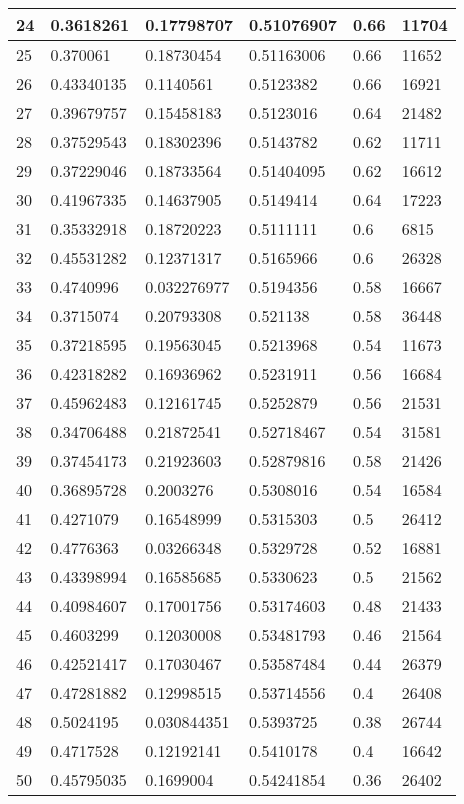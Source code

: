 \begin{longtable}{|l|l|l|l|l|l|}
24 & 0.3618261 & 0.17798707 & 0.51076907 & 0.66 & 11704 \\ \hline 
25 & 0.370061 & 0.18730454 & 0.51163006 & 0.66 & 11652 \\ \hline 
26 & 0.43340135 & 0.1140561 & 0.5123382 & 0.66 & 16921 \\ \hline 
27 & 0.39679757 & 0.15458183 & 0.5123016 & 0.64 & 21482 \\ \hline 
28 & 0.37529543 & 0.18302396 & 0.5143782 & 0.62 & 11711 \\ \hline 
29 & 0.37229046 & 0.18733564 & 0.51404095 & 0.62 & 16612 \\ \hline 
30 & 0.41967335 & 0.14637905 & 0.5149414 & 0.64 & 17223 \\ \hline 
31 & 0.35332918 & 0.18720223 & 0.5111111 & 0.6 & 6815 \\ \hline 
32 & 0.45531282 & 0.12371317 & 0.5165966 & 0.6 & 26328 \\ \hline 
33 & 0.4740996 & 0.032276977 & 0.5194356 & 0.58 & 16667 \\ \hline 
34 & 0.3715074 & 0.20793308 & 0.521138 & 0.58 & 36448 \\ \hline 
35 & 0.37218595 & 0.19563045 & 0.5213968 & 0.54 & 11673 \\ \hline 
36 & 0.42318282 & 0.16936962 & 0.5231911 & 0.56 & 16684 \\ \hline 
37 & 0.45962483 & 0.12161745 & 0.5252879 & 0.56 & 21531 \\ \hline 
38 & 0.34706488 & 0.21872541 & 0.52718467 & 0.54 & 31581 \\ \hline 
39 & 0.37454173 & 0.21923603 & 0.52879816 & 0.58 & 21426 \\ \hline 
40 & 0.36895728 & 0.2003276 & 0.5308016 & 0.54 & 16584 \\ \hline 
41 & 0.4271079 & 0.16548999 & 0.5315303 & 0.5 & 26412 \\ \hline 
42 & 0.4776363 & 0.03266348 & 0.5329728 & 0.52 & 16881 \\ \hline 
43 & 0.43398994 & 0.16585685 & 0.5330623 & 0.5 & 21562 \\ \hline 
44 & 0.40984607 & 0.17001756 & 0.53174603 & 0.48 & 21433 \\ \hline 
45 & 0.4603299 & 0.12030008 & 0.53481793 & 0.46 & 21564 \\ \hline 
46 & 0.42521417 & 0.17030467 & 0.53587484 & 0.44 & 26379 \\ \hline 
47 & 0.47281882 & 0.12998515 & 0.53714556 & 0.4 & 26408 \\ \hline 
48 & 0.5024195 & 0.030844351 & 0.5393725 & 0.38 & 26744 \\ \hline 
49 & 0.4717528 & 0.12192141 & 0.5410178 & 0.4 & 16642 \\ \hline 
50 & 0.45795035 & 0.1699004 & 0.54241854 & 0.36 & 26402 \\ \hline 
\end{longtable}